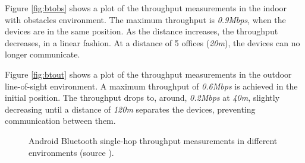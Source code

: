 Figure \ref{fig:btobs} shows a plot of the throughput measurements in the indoor with obstacles environment. The maximum throughput is \textit{0.9Mbps}, when the devices are in the same position. As the distance increases, the throughput decreases, in a linear fashion. At a distance of 5 offices (\textit{20m}), the devices can no longer communicate.

Figure \ref{fig:btout} shows a plot of the throughput measurements in the outdoor line-of-sight environment. A maximum throughput of \textit{0.6Mbps} is achieved in the initial position. The throughput drops to, around, \textit{0.2Mbps} at \textit{40m}, slightly decreasing until a distance of \textit{120m} separates the devices, preventing communication between them.

\begin{figure}[ht]
	\centering
	\par\medskip
	\par\medskip        
	\caption{Android Bluetooth single-hop throughput measurements in different environments (source \cite{throughputpaper}).}
	\label{fig:btthroughput}
\end{figure}

